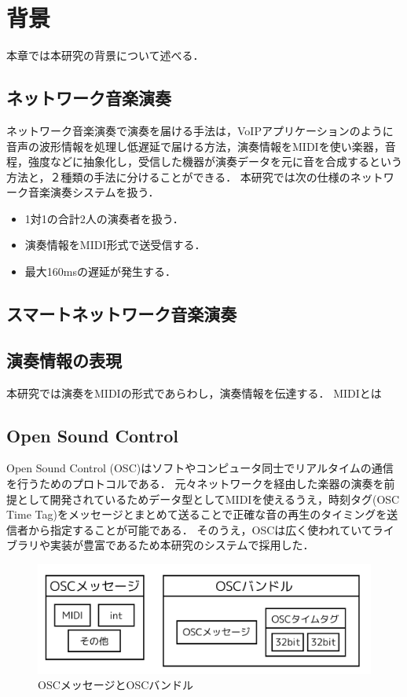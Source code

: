 \chapter{背景}
\label{background}

本章では本研究の背景について述べる．

\section{ネットワーク音楽演奏}
ネットワーク音楽演奏で演奏を届ける手法は，VoIPアプリケーションのように音声の波形情報を処理し低遅延で届ける方法\cite{syncroom}\cite{lola}\cite{jacktrip}，演奏情報をMIDIを使い楽器，音程，強度などに抽象化し，受信した機器が演奏データを元に音を合成するという方法\cite{rtpmidi}\cite{sourcenode}と，２種類の手法に分けることができる．
本研究では次の仕様のネットワーク音楽演奏システムを扱う．

\begin{itemize}
  \item 1対1の合計2人の演奏者を扱う．
  \item 演奏情報をMIDI形式で送受信する．
  \item 最大160msの遅延が発生する．
\end{itemize}

\section{スマートネットワーク音楽演奏}
\cite{alexandraki:2013} \cite{admet}

\section{演奏情報の表現}
本研究では演奏をMIDIの形式であらわし，演奏情報を伝達する．
MIDIとは

\section{Open Sound Control}
Open Sound Control (OSC)\cite{opensoundcontrol}はソフトやコンピュータ同士でリアルタイムの通信を行うためのプロトコルである．
元々ネットワークを経由した楽器の演奏を前提として開発されているためデータ型としてMIDIを使えるうえ，時刻タグ(OSC Time Tag)をメッセージとまとめて送ることで正確な音の再生のタイミングを送信者から指定することが可能である．
そのうえ，OSCは広く使われていてライブラリや実装が豊富であるため本研究のシステムで採用した．

\begin{figure}[htbp]
  \centering
  \includegraphics[width=0.8\linewidth]{src/img/g1736.png}
  \caption{OSCメッセージとOSCバンドル}
  \label{fig:oscmess}
\end{figure}

